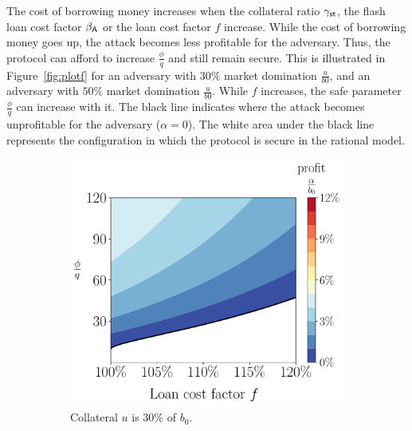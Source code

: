  The cost of borrowing money increases when the collateral ratio
 $\gamma_{\textsf{st}}$, the flash loan cost factor $\beta_{\textsf{A}}$ or the loan cost factor $f$
 increase. While the cost of borrowing money goes up, the attack becomes less profitable
 for the adversary. Thus, the protocol can afford to increase $\frac{\phi}{q}$
 and still remain secure. This is illustrated in
 Figure~\ref{fig:plotf} for an adversary with $30\%$ market domination $\frac{u}{b0}$,
 and an adversary with $50\%$ market domination $\frac{u}{b0}$.
 While $f$ increases, the safe parameter $\frac{\phi}{q}$ can increase with it.
 The black line indicates where the attack becomes unprofitable for the adversary ($\alpha = 0$).
 The white area under the black line represents the configuration in which
 the protocol is secure in the rational model.

 \begin{figure}[htb]
   \centering
   \begin{subfigure}{0.49\textwidth}
     \includegraphics[width=\textwidth]{./figures/plotf30.pdf}
     \caption{Collateral $u$ is $30\%$ of $b_0$.}
     \label{fig:plotf30}
   \end{subfigure}
   \hfill
   \begin{subfigure}{0.49\textwidth}

\end{subfigure}
\end{figure}
